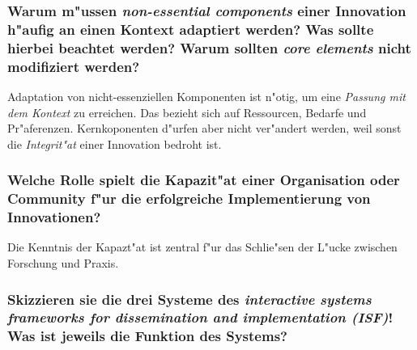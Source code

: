 \subsubsection{Warum m"ussen \emph{non-essential components} einer Innovation h"aufig an einen Kontext adaptiert werden? Was sollte hierbei beachtet werden? Warum sollten \emph{core elements} nicht modifiziert werden?}
Adaptation von nicht-essenziellen Komponenten ist n"otig, um eine \emph{Passung mit dem Kontext} zu erreichen. Das bezieht sich auf Ressourcen, Bedarfe und Pr"aferenzen. Kernkoponenten d"urfen aber nicht ver"andert werden, weil sonst die \emph{Integrit"at} einer Innovation bedroht ist.

\subsubsection{Welche Rolle spielt die Kapazit"at einer Organisation oder Community f"ur die erfolgreiche Implementierung von Innovationen?}
Die Kenntnis der Kapazt"at ist zentral f"ur das Schlie"sen der L"ucke zwischen Forschung und Praxis. 

\subsubsection{Skizzieren sie die drei Systeme des \emph{interactive systems frameworks for dissemination and implementation (ISF)}! Was ist jeweils die Funktion des Systems?}

